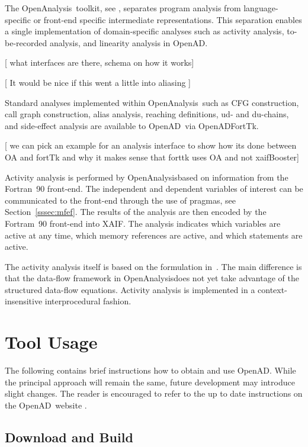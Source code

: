 \documentclass[acmtocl,acmnow]{acmtrans2m}
\newcommand{\OpenAD}{OpenAD}
\newcommand{\OpenADFortTk}{OpenADFortTk}
\newcommand{\OpenAnalysis}{OpenAnalysis}
\newcommand{\refsec}[1]{Section~\ref{#1}}
\begin{document}
The \OpenAnalysis\ toolkit, see \cite{oaWeb},  separates program analysis from 
language-specific or front-end specific intermediate representations.
This separation enables a single implementation of domain-specific 
analyses such
as activity analysis, to-be-recorded analysis, and linearity analysis
in  \OpenAD.

{\color{Red} [ what interfaces are there, schema on how it works] } 

{\color{Red} [ It would be nice if this went a little into aliasing ] } 
  

Standard analyses implemented within 
\OpenAnalysis\ such as
CFG construction, call graph construction,
alias analysis, reaching definitions, ud- and
du-chains, and side-effect analysis are available to \OpenAD\ 
via  \OpenADFortTk. 

{\color{Red} [ we can pick an example for an analysis interface 
to show how its done between OA and fortTk and why it makes sense 
that forttk uses OA and not xaifBooster] } 

Activity analysis is performed by \OpenAnalysis based on information
from the Fortran~90 front-end.  The independent and dependent variables of
interest can be communicated to the front-end through the use of pragmas, 
see \refsec{sssec:mfef}.
The results of the analysis are then 
encoded by the Fortram~90 front-end into XAIF.  The analysis indicates
which variables are active at any time, which memory references are active, 
and which statements are active.

The activity analysis itself is based on the formulation in~\cite{UweTBRPaper}.
The main difference is that the data-flow framework in \OpenAnalysis does not
yet take advantage of the structured data-flow equations.  Activity analysis is
implemented in a context-insensitive interprocedural fashion.


\section{Tool Usage}
The following contains brief instructions how to obtain and use \OpenAD. 
While the principal approach will remain the same, future development may 
introduce slight changes. The reader is encouraged to refer to the 
up to date instructions on the \OpenAD\ website \cite{openadWeb}.
\subsection{Download and Build} 
\end{document}
